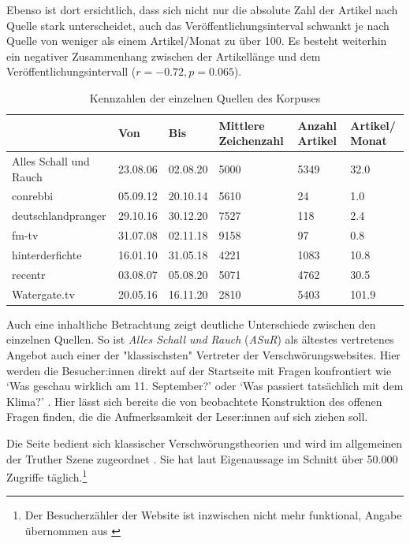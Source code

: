 Ebenso ist dort ersichtlich, dass sich nicht nur die absolute Zahl der Artikel nach Quelle stark unterscheidet, auch das Veröffentlichungsinterval schwankt je nach Quelle von weniger als einem Artikel/Monat zu über 100.
Es besteht weiterhin ein negativer Zusammenhang zwischen der Artikellänge und dem Veröffentlichungsintervall ($r = -0.72, p = 0.065$).

\begin{table}
    \begin{center}
        \begin{tabularx}{\textwidth}{l|XXXXX}
            \toprule
            & Von & Bis & Mittlere Zeichenzahl & Anzahl Artikel & Artikel/ Monat\\
            \midrule
            Alles Schall und Rauch & 23.08.06 & 02.08.20 & 5000 & 5349 & 32.0\\
            conrebbi & 05.09.12 & 20.10.14 & 5610 & 24 & 1.0\\
            deutschlandpranger & 29.10.16 & 30.12.20 & 7527 & 118 & 2.4\\
            fm-tv & 31.07.08 & 02.11.18 & 9158 & 97 & 0.8\\
            hinterderfichte & 16.01.10 & 31.05.18 & 4221 & 1083 & 10.8\\
            recentr & 03.08.07 & 05.08.20 & 5071 & 4762 & 30.5\\
            Watergate.tv & 20.05.16 & 16.11.20 & 2810 & 5403 & 101.9\\
            \bottomrule
            \end{tabularx}
        \caption{Kennzahlen der einzelnen Quellen des Korpuses}
        \label{corpus-stats}
    \end{center}
\end{table}

Auch eine inhaltliche Betrachtung zeigt deutliche Unterschiede zwischen den einzelnen Quellen.
So ist \textit{Alles Schall und Rauch} (\textit{ASuR}) als ältestes vertretenes Angebot auch einer der "klassischsten" Vertreter der Verschwörungswebsites.
Hier werden die Besucher:innen direkt auf der Startseite mit Fragen konfrontiert wie \enquote*{Was geschau wirklich am 11. September?} oder \enquote*{Was passiert tatsächlich mit dem Klima?} \parencite{asur-homepage}.
Hier lässt sich bereits die von \textcite[][205]{filatkina_2018} beobachtete Konstruktion des offenen Fragen finden, die die Aufmerksamkeit der Leser:innen auf sich ziehen soll.

Die Seite bedient sich klassischer Verschwörungstheorien und wird im allgemeinen der Truther Szene zugeordnet \parencite{psiram-asur}.
Sie hat laut Eigenaussage im Schnitt über 50.000 Zugriffe täglich.\footnote{Der Besucherzähler der Website ist inzwischen nicht mehr funktional, Angabe übernommen aus \textcite{vice-asur}}

